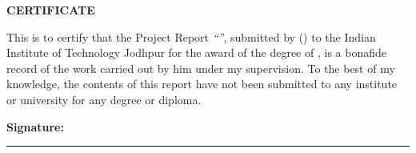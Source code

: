 \begin{center}
\huge{\textbf{CERTIFICATE}}
\end{center}

This is to certify that the Project Report \emph{``\ttitle''}, submitted by \authorname{} (\rn{}) to the Indian Institute of Technology Jodhpur for the award of the degree of \degree{}, is a bonafide record of the work carried out by him under my supervision. To the best of my knowledge, the contents of this report have not been submitted to any institute or university for any degree or diploma.

\vspace{2cm}
\begin{flushleft}
\textbf{Signature:} \rule{5cm}{0.4pt}

\vspace{0.5cm}
\supname
\end{flushleft}